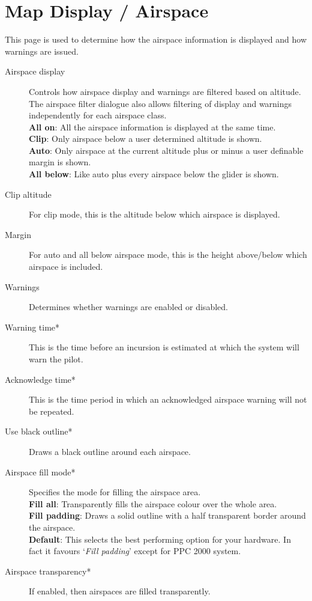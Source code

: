 \section{Map Display / Airspace}

This page is used to determine how the airspace information is
displayed and how warnings are issued.

\begin{description}
\item[Airspace display]  Controls how airspace display and warnings are filtered 
  based on altitude.  The airspace filter dialogue also allows filtering
  of display and warnings independently for each airspace class. \\
  {\bf All on}: All the airspace information is displayed at the same time. \\
  {\bf Clip}: Only airspace below a user determined altitude is shown. \\
  {\bf Auto}: Only airspace at the current altitude plus or minus a user 
    definable margin is shown.
 \\
  {\bf All below}:  Like auto plus every airspace below the glider is shown.
\item[Clip altitude] For clip mode, this is the altitude below which airspace 
  is displayed.
\item[Margin]  For auto and all below airspace mode, this is the height 
  above/below which airspace is included.
\item[Warnings]  Determines whether warnings are enabled or disabled.
\item[Warning time*]  This is the time before an incursion is estimated at
  which the system will warn the pilot.
\item[Acknowledge time*]  This is the time period in which an acknowledged airspace 
  warning will not be repeated.
\item[Use black outline*]  Draws a black outline around each airspace.
\item[Airspace fill mode*]  Specifies the mode for filling the airspace area. \\
  {\bf Fill all}:  Transparently fills the airspace colour over the whole area. \\
  {\bf Fill padding}: Draws a solid outline with a half transparent border 
    around the airspace. \\
  {\bf Default}:  This selects the best performing option for your hardware. In fact 
    it favours `{\it Fill padding}' except for PPC 2000 system.
\item[Airspace transparency*]  If enabled, then airspaces are filled transparently.
\end{description}

